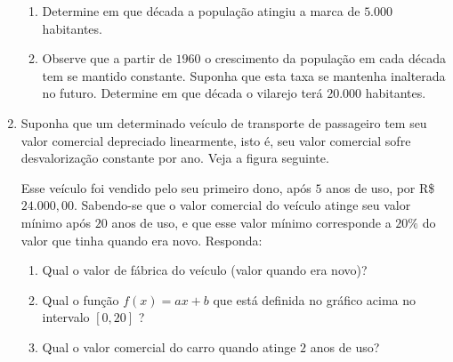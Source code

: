 \begin{enumerate}
\begin{figure}[H]
\end{figure}
\begin{enumerate}
\item {} 
Determine em que década a população atingiu a marca de \(5.000\) habitantes.

\item {} 
Observe que a partir de \(1960\) o crescimento da população em cada década tem se mantido constante. Suponha que esta taxa se mantenha inalterada no futuro. Determine em que década o vilarejo terá \(20.000\) habitantes.

\end{enumerate}

\item Suponha que um determinado veículo de transporte de passageiro tem seu valor comercial depreciado linearmente, isto é, seu valor comercial sofre desvalorização constante por ano. Veja a figura seguinte.
\begin{figure}[H]
\centering

\end{figure}

Esse veículo foi vendido pelo seu primeiro dono, após \(5\) anos de uso, por R\$ \(24.000{,}00\). Sabendo-se que o valor comercial do veículo atinge seu valor mínimo após \(20\) anos de uso, e que esse valor mínimo corresponde a \(20\%\) do valor que tinha quando era novo. Responda:
\begin{enumerate}
\item {} 
Qual o valor de fábrica do veículo (valor quando era novo)?

\item {} 
Qual o função \(f(x)=ax+b\) que está definida no gráfico acima no intervalo \([0,20]\) ?

\item {} 
Qual o valor comercial do carro quando atinge \(2\) anos de uso?

\end{enumerate}


\end{enumerate}
